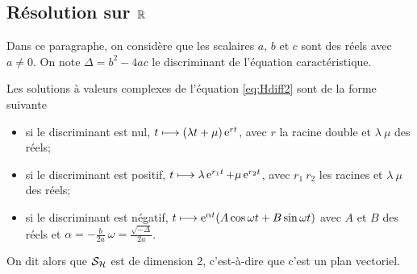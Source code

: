 \subsection{Résolution sur $\mathbb{R}$}
\label{subsec:resR}
Dans ce paragraphe, on considère que les scalaires $a$, $b$ et $c$ sont des réels avec $a \neq 0$. On note $\Delta=b^2-4ac$ le discriminant de l'équation caractéristique.
\begin{theo}
  \label{theo:6} 
  Les solutions à valeurs complexes de l'équation \eqref{eq:Hdiff2} sont de la forme suivante
  \begin{itemize}
  \item si le discriminant est nul, $t \longmapsto (\lambda t + \mu)\operatorname{e}^{rt}$, avec $r$ la racine double et $\lambda \ \mu$ des réels;
  \item si le discriminant est positif, $t \longmapsto \lambda \operatorname{e}^{r_1 t} + \mu \operatorname{e}^{r_2 t}$, avec $r_1 \ r_2$ les racines et $\lambda \ \mu$ des réels;
  \item si le discriminant est négatif, $t \longmapsto \operatorname{e}^{\alpha t} (A \cos \omega t + B \sin \omega t)$ avec $A$ et $B$ des réels et $\alpha=-\frac{b}{2a} \ \omega = \frac{\sqrt{-\Delta}}{2a}$.
  \end{itemize}
  On dit alors que $\mathcal{S}_{\mathcal{H}}$ est de dimension 2, c'est-à-dire que c'est un plan vectoriel.
\end{theo}
